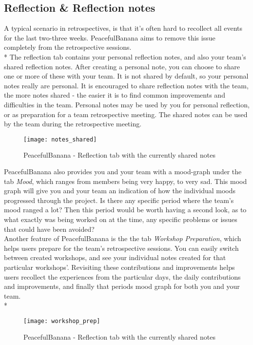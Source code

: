 \subsection{Reflection \& Reflection notes}
A typical scenario in retrospectives, is that it's often hard to recollect all events for the last two-three weeks. PeacefulBanana aims to remove this issue completely from the retrospective sessions.\\*
The reflection tab contains your personal reflection notes, and also your team's shared reflection notes. After creating a personal note, you can choose to share one or more of these with your team. It is not shared by default, so your personal notes really are personal. It is encouraged to share reflection notes with the team, the more notes shared - the easier it is to find common improvements and difficulties in the team. Personal notes may be used by you for personal reflection, or as preparation for a team retrospective meeting. The shared notes can be used by the team during the retrospective meeting.\\
\begin{figure}[h!]
\label{milestonessingular}
\centering
	\texttt{[image: notes\_shared]}
\caption{PeacefulBanana - Reflection tab with the currently shared notes}
\end{figure}
PeacefulBanana also provides you and your team with a mood-graph under the tab \textit{Mood}, which ranges from members being very happy, to very sad. This mood graph will give you and your team an indication of how the individual moods progressed through the project. Is there any specific period where the team's mood ranged a lot? Then this period would be worth having a second look, as to what exactly was being worked on at the time, any specific problems or issues that could have been avoided?\\

Another feature of PeacefulBanana is the the tab \textit{Workshop Preparation}, which helps users prepare for the team's retrospective sessions. You can easily switch between created workshops, and see your individual notes created for that particular workshops'. Revisiting these contributions and improvements helps users recollect the experiences from the particular days, the daily contributions and improvements, and finally that periods mood graph for both you and your team.\\*
\begin{figure}[h!]
\label{milestonessingular}
\centering
	\texttt{[image: workshop\_prep]}
\caption{PeacefulBanana - Reflection tab with the currently shared notes}
\end{figure}

